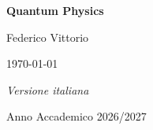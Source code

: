 \documentclass[a4paper, 10 pt]{book}
\begin{document}
\begin{titlepage}
    \centering
    \vspace*{3cm}
    {\Huge\bfseries Quantum Physics\par}
    
    \vspace{1.5cm}
    {\Large Federico Vittorio\par}
    
    \vspace{0.6cm}
    {\large \today\par}
    
    \vfill
    
    {\normalsize\itshape Versione italiana\par}
    \vspace{0.3cm}
    {\large Anno Accademico 2026/2027\par}
    \vspace*{1cm}
\end{titlepage}
\tableofcontents










\end{document}
